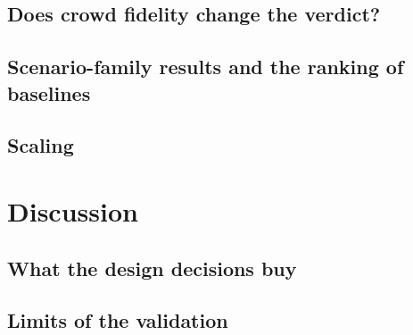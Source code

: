 \documentclass[pdflatex,sn-mathphys-num]{template/sn-jnl}%
\begin{document}
\subsection{Does crowd fidelity change the verdict?}
\label{sec:results:sensitivity}

\subsection{Scenario-family results and the ranking of baselines}
\label{sec:results:families}

\subsection{Scaling}
\label{sec:results:scaling}

\section{Discussion}
\label{sec:discussion}

\subsection{What the design decisions buy}
\label{sec:discussion:design}

\subsection{Limits of the validation}
\label{sec:discussion:limits}
\end{document}
